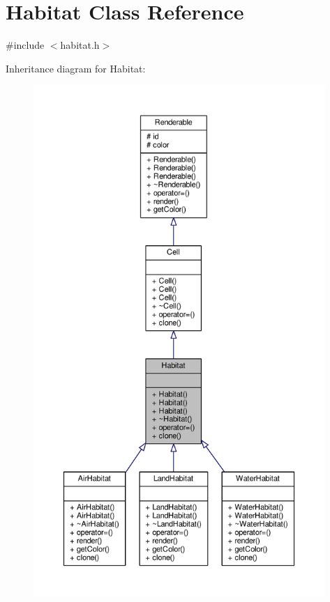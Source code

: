 \hypertarget{classHabitat}{}\section{Habitat Class Reference}
\label{classHabitat}


{\ttfamily \#include $<$habitat.\+h$>$}



Inheritance diagram for Habitat\+:
\nopagebreak
\begin{figure}[H]
\begin{center}
\leavevmode
\includegraphics[height=550pt]{classHabitat__inherit__graph}
\end{center}
\end{figure}


